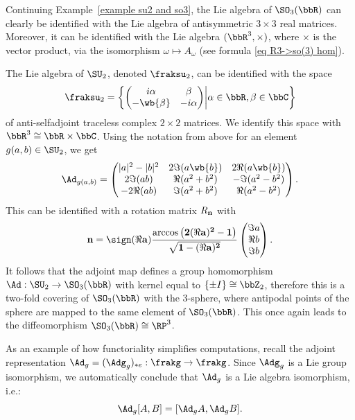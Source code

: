 \begin{example}\label{example Lie algebras of so3 and su2}
    Continuing Example~\ref{example su2 and so3}, 
    the Lie algebra of $\SO_3(\bbR)$ can clearly be identified with the Lie algebra of antisymmetric $3\times 3$ real matrices. Moreover, it can be identified with the Lie algebra $(\bbR^3,\times)$, where $\times$ is the vector product, via the isomorphism $\omega\mapsto A_{\omega}$ (see formula \eqref{eq R3->so(3) hom}). 
    
    The Lie algebra of $\SU_2$, denoted $\fraksu_2$, can be identified with the space
    \[\fraksu_2=\left\{
    \begin{pmatrix}
        i\alpha&\beta\\-\wb{\beta}&-i\alpha
    \end{pmatrix}
    \middle| \alpha\in\bbR,\beta\in\bbC
    \right\}\]
    of anti-selfadjoint traceless complex $2\times 2$ matrices. We identify this space with $\bbR^3\cong \bbR\times \bbC$. Using the notation from above for an element $g(a,b)\in\SU_2$, we get
    \[\Ad_{g(a,b)}=
    \begin{pmatrix}
        |a|^2-|b|^2&2\Im (a\wb{b}) & 2\Re(a\wb{b}) \\
        2\Im(ab) & \Re(a^2+b^2) & -\Im(a^2-b^2)\\
        -2\Re(ab) & \Im(a^2+b^2) & \Re(a^2-b^2)
    \end{pmatrix}.\label{eq Ad: su2->so3}
    \]
    This can be identified with a rotation matrix $R_{\bf n}$ with
    \[\bf n=\sign(\Re a)\frac{\arccos\left(2(\Re a)^2-1\right)}{\sqrt{1-(\Re a)^2}}
    \begin{pmatrix}
        \Im a\\ \Re b \\ \Im b
    \end{pmatrix}.
    \]
    It follows that the adjoint map defines a group homomorphism $\Ad:\SU_2\to \SO_3(\bbR)$ with kernel equal to $\{\pm I\}\cong \bbZ_2$, therefore this is a two-fold covering of $\SO_3(\bbR)$ with the 3-sphere, where antipodal points of the sphere are mapped to the same element of $\SO_3(\bbR)$. This once again leads to the diffeomorphism $\SO_3(\bbR)\cong \RP^3$.
\end{example}



\begin{example}
    As an example of how functoriality simplifies computations, recall the adjoint representation $\Ad_g=(\Adg_g)_{\ast e}:\frakg\to \frakg$. Since $\Adg_g$ is a Lie group isomorphism, we automatically conclude that $\Ad_g$ is a Lie algebra isomorphism, i.e.:
    \[\Ad_g[A,B]=[\Ad_g A,\Ad_g B].\]
\end{example}

